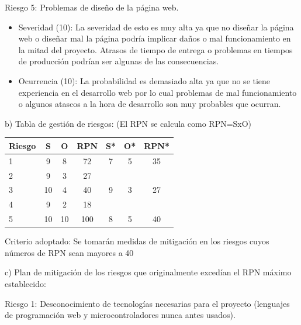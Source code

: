 \documentclass[
11pt, %
]{charter}
\begin{document}
Riesgo 5: Problemas de diseño de la página web.
\begin{itemize}
	\item Severidad (10):
	La severidad de esto es muy alta ya que no diseñar la página web o diseñar mal la página podría implicar daños o mal funcionamiento en la mitad del proyecto. Atrasos de tiempo de entrega o problemas en tiempos de producción podrían ser algunas de las consecuencias.

	\item Ocurrencia (10):
	La probabilidad es demasiado alta ya que no se tiene experiencia en el desarrollo web por lo cual problemas de mal funcionamiento o algunos atascos a la hora de desarrollo son muy probables que ocurran.

\end{itemize}


b) Tabla de gestión de riesgos:      (El RPN se calcula como RPN=SxO)

\begin{table}[htpb]
\centering
\begin{tabularx}{\linewidth}{@{}|X|c|c|c|c|c|c|@{}}
\hline
\rowcolor[HTML]{C0C0C0} 
Riesgo & S & O & RPN & S* & O* & RPN* \\ \hline
  1     &  9  &  8   &  72    &  7   &   5   &  35      \\ \hline
  2     &  9  &  3   &  27    &      &       &      \\ \hline
  3     &  10 &  4   &  40    &  9   &   3   &  27     \\ \hline
  4     &  9  &  2   &  18    &      &       &      \\ \hline
  5     &  10 &  10  &  100   &  8   &   5   &  40    \\ \hline
\end{tabularx}%
\end{table}

Criterio adoptado: 
Se tomarán medidas de mitigación en los riesgos cuyos números de RPN sean mayores a 40

c) Plan de mitigación de los riesgos que originalmente excedían el RPN máximo establecido:
 
Riesgo 1: Desconocimiento de tecnologías necesarias para el proyecto (lenguajes de programación web y microcontroladores nunca antes usados).
\end{document}
